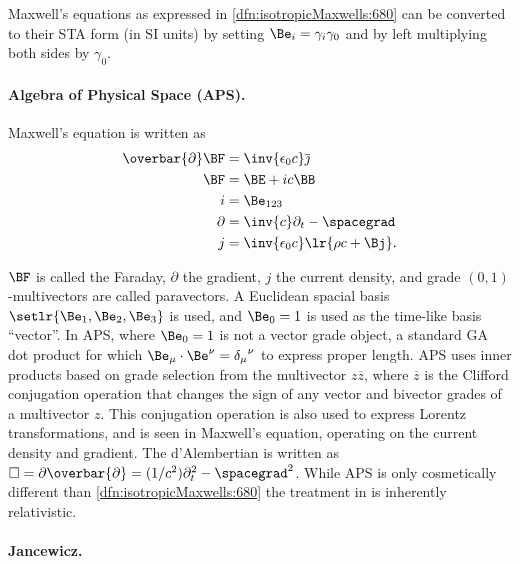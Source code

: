 Maxwell's equations as expressed in \cref{dfn:isotropicMaxwells:680} can be converted to their STA form (in SI units) by setting \( \Be_i = \gamma_i \gamma_0 \) and by left multiplying both sides by \( \gamma_0 \).

\paragraph{Algebra of Physical Space (APS).  \citep{baylis2004electrodynamics}}
Maxwell's equation is written as
\begin{equation}\label{eqn:galiterature:40}
\begin{aligned}
\overbar{\partial} \BF &= \inv{\epsilon_0 c} \overline{\jmath} \\
\BF &= \BE + i c \BB \\
i &= \Be_{123} \\
\partial &= \inv{c} \partial_t - \spacegrad \\
j &= \inv{\epsilon_0 c} \lr{ \rho c + \Bj }.
\end{aligned}
\end{equation}

\( \BF \) is called the Faraday, \( \partial \) the gradient, \( j \) the current density, and
grade \((0,1)\)-multivectors are called paravectors.
A Euclidean spacial basis \( \setlr{ \Be_1, \Be_2, \Be_3 } \) is used, and \( \Be_0 = 1 \) is used as the time-like basis ``vector''.
In APS, where \( \Be_0 = 1 \) is not a vector grade object, a standard GA dot product for which \( \Be_\mu \cdot \Be^\nu = {\delta_\mu}^\nu \)
to express proper length.
APS uses inner products based on grade selection from the multivector \( z \overbar{z} \), where
\( \overbar{z} \) is the Clifford conjugation operation
that changes the sign of any vector and bivector grades of a multivector \( z \).
This conjugation operation is also used to express Lorentz transformations, and is seen in Maxwell's equation, operating on the current density and gradient.
The d'Alembertian is written as \( \Box = \partial \overbar{\partial} = (1/c^2) \partial_t^2 - \spacegrad^2 \).
While APS is only cosmetically different than \cref{dfn:isotropicMaxwells:680} the treatment in \citep{baylis2004electrodynamics} is inherently relativistic.

\paragraph{Jancewicz.  \citep{jancewicz1988multivectors}}

